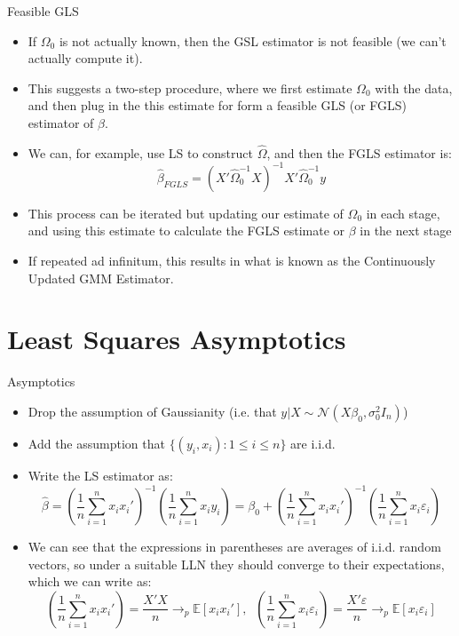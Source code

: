 \documentclass[fleqn, 10pt]{beamer}
\newcommand{\E}{\mathbb{E}}
\begin{document}
\begin{frame}{Feasible GLS}
	
	\begin{itemize}
		\item If \( \Omega_0 \) is not actually known, then the GSL estimator is not feasible (we can't actually compute it).
		\item This suggests a two-step procedure, where we first estimate \( \Omega_0 \) with the data, and then plug in the this estimate for form a feasible GLS (or FGLS) estimator of \( \beta \).
		\item We can, for example, use LS to construct \( \hat{\Omega} \), and then the FGLS estimator is:
		\[ \hat{\beta}_{FGLS} = \left( X' \hat{\Omega}_0^{-1} X \right)^{-1} X' \hat{\Omega}_0^{-1} y \]
		\item This process can be iterated but updating our estimate of \( \Omega_0 \) in each stage, and using this estimate to calculate the FGLS estimate or \(\beta \) in the next stage
		\item If repeated ad infinitum, this results in what is known as the Continuously Updated GMM Estimator.
	\end{itemize}
	
\end{frame}


\section{Least Squares Asymptotics}

\begin{frame}{Asymptotics}
	
	\begin{itemize}
		\item Drop the assumption of Gaussianity (i.e. that \( y|X \sim \mathcal{N}(X\beta_0, \sigma_0^2 I_n) \))
		\item Add the assumption that \( \{ (y_i, x_i) : 1 \leq i \leq n \} \) are i.i.d.
		\item Write the LS estimator as:
		\[ \hat{\beta} = \left( \frac{1}{n} \sum_{i=1}^{n} x_i x_i' \right)^{-1} \left( \frac{1}{n} \sum_{i=1}^{n} x_i y_i \right) = \beta_0 + \left( \frac{1}{n} \sum_{i=1}^{n} x_i x_i' \right)^{-1} \left( \frac{1}{n} \sum_{i=1}^{n} x_i \varepsilon_i \right) \]
		\item We can see that the expressions in parentheses are averages of i.i.d. random vectors, so under a suitable LLN they should converge to their expectations, which we can write as:
		\[ \left( \frac{1}{n} \sum_{i=1}^{n} x_i x_i' \right) = \frac{X'X}{n} \to_p \E[x_i x_i'], \;\; \left( \frac{1}{n} \sum_{i=1}^{n} x_i \varepsilon_i \right) = \frac{X'\varepsilon}{n} \to_p \E[x_i \varepsilon_i] \]
	\end{itemize}
	
\end{frame}
\end{document}
